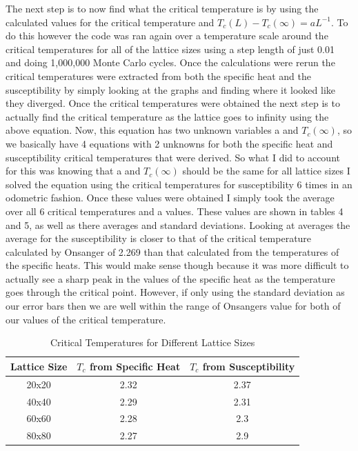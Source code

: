 \documentclass[12pt,righttag]{article}
\begin{document}
		The next step is to now find what the critical temperature is by using the calculated values for the critical temperature and $T_c(L)-T_c(\infty)=aL^{-1}$. To do this however the code was ran again over a temperature scale around the critical temperatures for all of the lattice sizes using a step length of just 0.01 and doing 1,000,000 Monte Carlo cycles. Once the calculations were rerun the critical temperatures were extracted from both the specific heat and the susceptibility by simply looking at the graphs and finding where it looked like they diverged. Once the critical temperatures were obtained the next step is to actually find the critical temperature as the lattice goes to infinity using the above equation. Now, this equation has two unknown variables a and $T_c(\infty)$, so we basically have 4 equations with 2 unknowns for both the specific heat and susceptibility critical temperatures that were derived. So what I did to account for this was knowing that a and $T_c(\infty)$ should be the same for all lattice sizes I solved the equation using the critical temperatures for susceptibility 6 times in an odometric fashion. Once these values were obtained I simply took the average over all 6 critical temperatures and a values. These values are shown in tables 4 and 5, as well as there averages and standard deviations. Looking at averages the average for the susceptibility is closer to that of the critical temperature calculated by Onsanger of 2.269 than that calculated from the temperatures of the specific heats. This would make sense though because it was more difficult to actually see a sharp peak in the values of the specific heat as the temperature goes through the critical point. However, if only using the standard deviation as our error bars then we are well within the range of Onsangers value for both of our values of the critical temperature.
		
		
			\begin{table}
				\begin{center}
					\caption{Critical Temperatures for Different Lattice Sizes}
					\begin{tabular}{c c c}
						\hline\hline
						Lattice Size & $T_c$ from Specific Heat & $T_c$ from Susceptibility  \\ 
						\hline
						20x20 & 2.32 & 2.37\\
						40x40 & 2.29 & 2.31 \\
						60x60 & 2.28 & 2.3 \\
						80x80 & 2.27 & 2.9  \\
					
						
						\hline
					\end{tabular}
				\end{center}
			\end{table}
		
\end{document}
